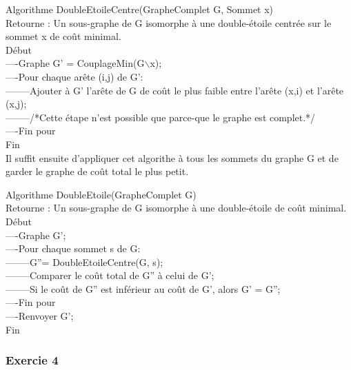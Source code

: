 \documentclass[]{article}
\begin{document}
Algorithme DoubleEtoileCentre(GrapheComplet G, Sommet x)\\
Retourne : Un sous-graphe de G isomorphe à une double-étoile centrée sur le sommet x de coût minimal.\\

Début\\
----Graphe G' = CouplageMin(G$\backslash$x);\\
----Pour chaque arête (i,j) de G':\\
--------Ajouter à G' l'arête de G de coût le plus faible entre l'arête (x,i) et l'arête (x,j);\\
--------/*Cette étape n'est possible que parce-que le graphe est complet.*/\\
----Fin pour\\
Fin\\

Il suffit ensuite d'appliquer cet algorithe à tous les sommets du graphe G et de garder le graphe de coût total le plus petit.

Algorithme DoubleEtoile(GrapheComplet G)\\
Retourne : Un sous-graphe de G isomorphe à une double-étoile de coût minimal.\\

Début\\
----Graphe G';\\
----Pour chaque sommet s de G:\\
--------G''= DoubleEtoileCentre(G, s);\\
--------Comparer le coût total de G'' à celui de G';\\
--------Si le coût de G'' est inférieur au coût de G', alors G' = G'';\\
----Fin pour\\
----Renvoyer G';\\
Fin\\

\subsubsection{Exercie 4}
\end{document}
